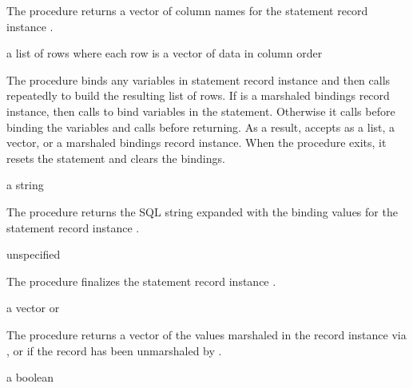 The  procedure returns a vector of column names
for the statement record instance .

\begin{procedure}
\end{procedure}
\returns{} a list of rows where each row is a vector of data in column order

The  procedure binds any variables in statement
record instance  and then calls  repeatedly to build the resulting list of rows.
If  is a marshaled bindings record instance,
then  calls 
to bind variables in the statement.
Otherwise it calls 
before binding the variables and calls 
before returning.
As a result,  accepts as  a list,
a vector, or a marshaled bindings record instance.
When the procedure exits, it resets the statement and clears the bindings.

\begin{procedure}
\end{procedure}
\returns{} a string

The  procedure returns the SQL string
expanded with the binding values for the statement record instance
.

\begin{procedure}
\end{procedure}
\returns{} unspecified

The  procedure finalizes the statement record
instance .

\begin{procedure}
\end{procedure}
\returns{} a vector or 

The  procedure returns a vector of the values
marshaled in the  record instance via ,
or  if the record has been unmarshaled by
.

\begin{procedure}
\end{procedure}
\returns{} a boolean

